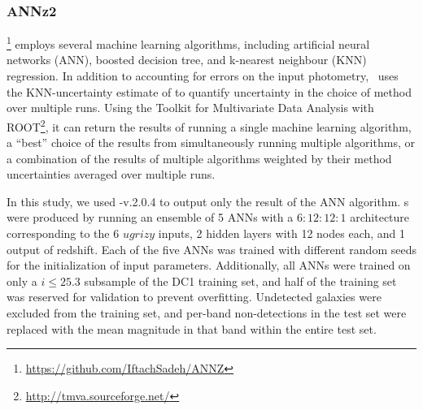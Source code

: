 
\subsubsection{ANNz2}

\annz \footnote{\url{https://github.com/IftachSadeh/ANNZ}} \citep{Sadeh:16} employs several machine learning algorithms, including artificial neural networks (ANN), boosted decision tree, and k-nearest neighbour (KNN) regression.
In addition to accounting for errors on the input photometry, \annz\ uses the KNN-uncertainty estimate of \citet{Oyaizu:08} to quantify uncertainty in the choice of method over multiple runs.
Using the Toolkit for Multivariate Data Analysis with ROOT\footnote{\url{http://tmva.sourceforge.net/}}, it can return the results of running a single machine learning algorithm, a ``best'' choice of the results from simultaneously running multiple algorithms, or a combination of the results of multiple algorithms weighted by their method uncertainties averaged over multiple runs.

In this study, we used \annz-v.2.0.4 to output only the result of the ANN algorithm.
\Pzpdf s were produced by running an ensemble of 5 ANNs with a $6:12:12:1$ architecture corresponding to the 6 $ugrizy$ inputs, 2 hidden layers with 12 nodes each, and 1 output of redshift.
Each of the five ANNs was trained with different random seeds for the initialization of input parameters.
Additionally, all ANNs were trained on only a $i \leq 25.3$ subsample of the DC1 training set, and half of the training set was reserved for validation to prevent overfitting.
Undetected galaxies were excluded from the training set, and per-band non-detections in the test set were replaced with the mean magnitude in that band within the entire test set.

